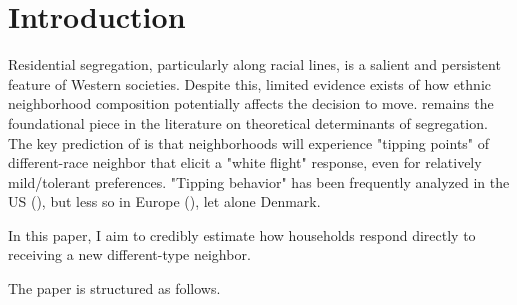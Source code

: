 \documentclass[../main.tex]{subfiles}
\begin{document}
\section{Introduction}

Residential segregation, particularly along racial lines, is a salient and persistent feature of Western societies. Despite this, limited evidence exists of how ethnic neighborhood composition potentially affects the decision to move. \textcite{schelling1971dynamic} remains the foundational piece in the literature on theoretical determinants of segregation. The key prediction of \textcite{schelling1971dynamic} is that neighborhoods will experience "tipping points" of different-race neighbor that elicit a "white flight" response, even for relatively mild/tolerant preferences. "Tipping behavior" has been frequently analyzed in the US (\textcite{Ananat_2011, davis2018long, chetty2015impacts}), but less so in Europe (\textcite{bohlmark_willen_2020_tipping}), let alone Denmark. 

In this paper, I aim to credibly estimate how households respond directly to receiving a new different-type neighbor.


The paper is structured as follows. 
\end{document}
